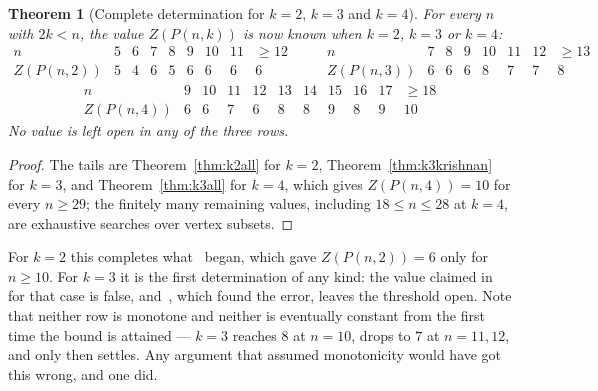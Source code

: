 \documentclass[11pt]{article}
\newtheorem{theorem}{Theorem}
\theoremstyle{definition}
\begin{document}
\begin{theorem}[Complete determination for $k=2$, $k=3$ and $k=4$]
\label{thm:complete}
For every $n$ with $2k<n$, the value $Z(P(n,k))$ is now known when $k=2$, $k=3$
or $k=4$:
\[
\begin{array}{r|cccccccc}
 n            & 5 & 6 & 7 & 8 & 9 & 10 & 11 & \ge12\\ \hline
 Z(P(n,2))    & 5 & 4 & 6 & 5 & 6 & 6  & 6  & 6
\end{array}
\qquad
\begin{array}{r|ccccccc}
 n            & 7 & 8 & 9 & 10 & 11 & 12 & \ge13\\ \hline
 Z(P(n,3))    & 6 & 6 & 6 & 8  & 7  & 7  & 8
\end{array}
\]
\[
\begin{array}{r|ccccccccc|c}
 n            & 9 & 10 & 11 & 12 & 13 & 14 & 15 & 16 & 17 & \ge18\\ \hline
 Z(P(n,4))    & 6 & 6  & 7  & 6  & 8  & 8  & 9  & 8  & 9  & 10
\end{array}
\]
No value is left open in any of the three rows.
\end{theorem}

\begin{proof}
The tails are Theorem~\ref{thm:k2all} for $k=2$,
Theorem~\ref{thm:k3krishnan} for $k=3$, and Theorem~\ref{thm:k3all} for $k=4$,
which gives $Z(P(n,4))=10$ for every $n\ge29$; the finitely many remaining
values, including $18\le n\le28$ at $k=4$, are exhaustive searches over vertex
subsets.
\end{proof}

\noindent
For $k=2$ this completes what~\cite{RST} began, which gave $Z(P(n,2))=6$ only
for $n\ge10$. For $k=3$ it is the first determination of any kind: the value
claimed in~\cite{RST} for that case is false, and~\cite{K}, which found the
error, leaves the threshold open. Note that neither row is monotone and neither
is eventually constant from the first time the bound is attained --- $k=3$
reaches $8$ at $n=10$, drops to $7$ at $n=11,12$, and only then settles. Any
argument that assumed monotonicity would have got this wrong, and one did.
\end{document}
